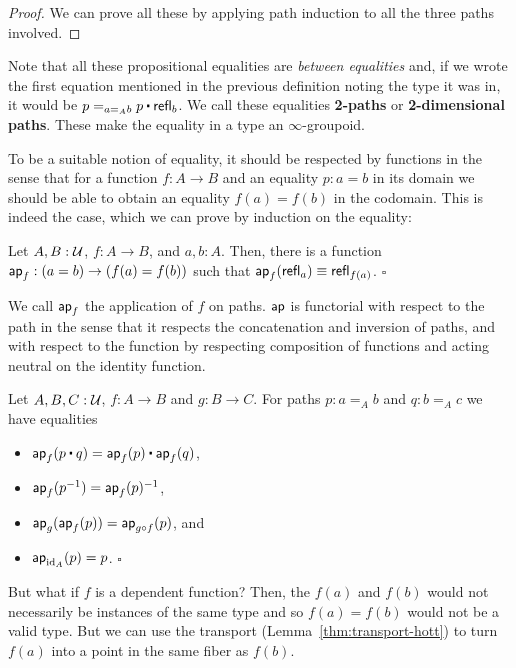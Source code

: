 \begin{proof}
We can prove all these by applying path induction to all the three paths involved.
\end{proof}

Note that all these propositional equalities are \emph{between equalities} and,
if we wrote the first equation mentioned in the previous definition noting the
type it was in, it would be $p =_{a =_A b} p \ct \refl_b$.
We call these equalities \textbf{2-paths} or \textbf{2-dimensional paths}.
These make the equality in a type an $\infty$-groupoid.

To be a suitable notion of equality, it should be respected by functions in the
sense that for a function $f : A \to B$ and an equality $p : a = b$ in its domain
we should be able to obtain an equality $f(a) = f(b)$ in the codomain.
This is indeed the case, which we can prove by induction on the equality:
\begin{lemma}
Let $A, B : \mathcal{U}$, $f : A \to B$, and $a, b : A$. Then, there is a function
$\mathsf{ap}_f : (a = b) \to (f(a) = f(b))$ such that $\mathsf{ap}_f(\mathsf{refl}_a) \equiv \mathsf{refl}_{f(a)}$.
\hfill $\square$
\end{lemma}

We call $\mathsf{ap}_f$ the application of $f$ on paths. $\mathsf{ap}$ is functorial with respect
to the path in the sense that it respects the concatenation and inversion of
paths, and with respect to the function by respecting composition of functions
and acting neutral on the identity function.

\begin{lemma}
Let $A, B, C : \mathcal{U}$, $f : A \to B$ and $g : B \to C$. For paths $p : a =_A b$ and
$q : b =_A c$ we have equalities
\begin{itemize}
\item $\ap_f(p \ct q) = \ap_f(p) \ct \ap_f(q)$,
\item $\mathsf{ap}_f(p^{-1}) = \mathsf{ap}_f(p)^{-1}$,
\item $\mathsf{ap}_g(\mathsf{ap}_f(p)) = \mathsf{ap}_{g \circ f}(p)$, and
\item $\mathsf{ap}_{\operatorname{id}_A}(p) = p$. \hfill $\square$
\end{itemize}
\end{lemma}

But what if $f$ is a dependent function? Then, the $f(a)$ and $f(b)$ would not
necessarily be instances of the same type and so $f(a) = f(b)$ would not be a
valid type.
But we can use the transport (Lemma~\ref{thm:transport-hott}) to turn $f(a)$ into
a point in the same fiber as $f(b)$.

